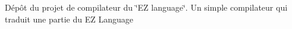 \href{https://travis-ci.org/ezlanguage/ezlanguage}{\tt }

Dépôt du projet de compilateur du \char`\"{}\+E\+Z language\char`\"{}. Un simple compilateur qui traduit une partie du EZ Language 